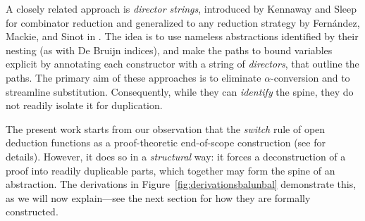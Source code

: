 \documentclass[runningheads]{llncs}
\newcommand\BA{{\scriptstyle B\!\raisebox{.5ex}{$\scriptstyle A$}}}
\newcommand\imp{\mathbin\rightarrow}
\newcommand\adbmal{\reflectbox{$\lambda$}}
\newcommand\red{\color{red}}
\newcommand\blue{\color{blue}}
\newcommand\black{\color{black}}
\newcommand\dirL{{\scriptscriptstyle\shortleftarrow}}
\newcommand\dirR{{\scriptscriptstyle\shortrightarrow}}
\newcommand\var{{\scriptstyle\square}}
\begin{document}
%
A closely related approach is \emph{director strings}, introduced by Kennaway and Sleep \cite{Kennaway-Sleep-1988} for combinator reduction and generalized to any reduction strategy by Fern\'{a}ndez, Mackie, and Sinot in \cite{Fernandez-Mackie-Sinot-2005}. The idea is to use nameless abstractions identified by their nesting (as with De Bruijn indices), and make the paths to bound variables explicit by annotating each constructor with a string of \emph{directors}, that outline the paths. The primary aim of these approaches is to eliminate $\alpha$-conversion and to streamline substitution. Consequently, while they can \emph{identify} the spine, they do not readily isolate it for duplication. %

The present work starts from our observation that the \emph{switch} rule of open deduction functions as a proof-theoretic end-of-scope construction (see \cite{sherratt2019atomic} for details). However, it does so in a \emph{structural} way: it forces a deconstruction of a proof into readily duplicable parts, which together may form the spine of an abstraction. The derivations in Figure~\ref{fig:derivationsbalunbal} demonstrate this, as we will now explain---see the next section for how they are formally constructed.

\end{document}
